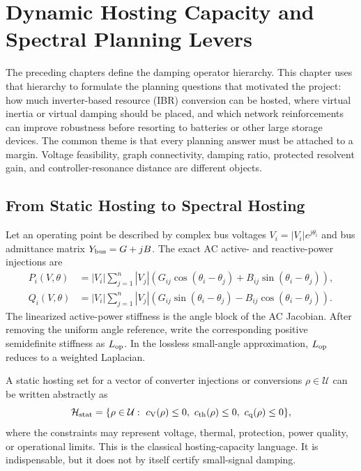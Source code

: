 \chapter{Dynamic Hosting Capacity and Spectral Planning Levers}

The preceding chapters define the damping operator hierarchy. This chapter
uses that hierarchy to formulate the planning questions that motivated the
project: how much inverter-based resource (IBR) conversion can be hosted, where
virtual inertia or virtual damping should be placed, and which network
reinforcements can improve robustness before resorting to batteries or other
large storage devices. The common theme is that every planning answer must be
attached to a margin. Voltage feasibility, graph connectivity, damping ratio,
protected resolvent gain, and controller-resonance distance are different
objects.

\section{From Static Hosting to Spectral Hosting}

Let an operating point be described by complex bus voltages
\(V_i=|V_i|e^{j\theta_i}\) and bus admittance matrix
\(Y_{\rm bus}=G+jB\). The exact AC active- and reactive-power injections are
\begin{align}
  P_i(V,\theta)
  &=
  |V_i|\sum_{j=1}^n |V_j|
  \left(
  G_{ij}\cos(\theta_i-\theta_j)
  +
  B_{ij}\sin(\theta_i-\theta_j)
  \right),
  \label{eq:ac_active_power}\\
  Q_i(V,\theta)
  &=
  |V_i|\sum_{j=1}^n |V_j|
  \left(
  G_{ij}\sin(\theta_i-\theta_j)
  -
  B_{ij}\cos(\theta_i-\theta_j)
  \right).
  \label{eq:ac_reactive_power}
\end{align}
The linearized active-power stiffness is the angle block of the AC Jacobian.
After removing the uniform angle reference, write the corresponding positive
semidefinite stiffness as \(L_{\rm op}\). In the lossless small-angle
approximation, \(L_{\rm op}\) reduces to a weighted Laplacian.

A static hosting set for a vector of converter injections or conversions
\(\rho\in\mathcal U\) can be written abstractly as
\begin{equation}
  \mathcal H_{\rm stat}
  =
  \{\rho\in\mathcal U:\ c_{\rm V}(\rho)\le0,\ 
  c_{\rm th}(\rho)\le0,\ c_{\rm q}(\rho)\le0\},
  \label{eq:static_hosting_set}
\end{equation}
where the constraints may represent voltage, thermal, protection, power
quality, or operational limits. This is the classical hosting-capacity
language. It is indispensable, but it does not by itself certify small-signal
damping.

